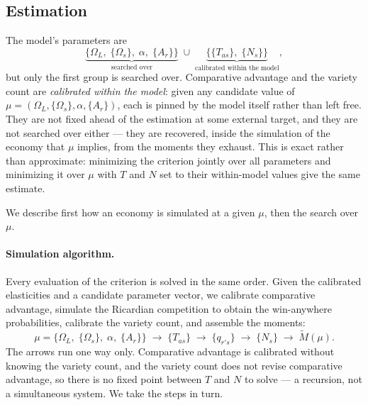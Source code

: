 \subsection{Estimation}
\label{app:model-estimation}

The model's parameters are
\begin{equation}
\underbrace{\big\{\Omega_{L},\;\{\Omega_{s}\},\;\alpha,\;\{A_{r}\}\big\}}_{\text{searched over}}
\;\cup\;
\underbrace{\big\{\{T_{as}\},\;\{N_{s}\}\big\}}_{\text{calibrated within the model}},
\label{eq:app-param-split}
\end{equation}
but only the first group is searched over. Comparative advantage and the variety count are
\emph{calibrated within the model}: given any candidate value of
$\mu=(\Omega_{L},\{\Omega_{s}\},\alpha,\{A_{r}\})$, each is pinned by the model itself rather
than left free. They are not fixed ahead of the estimation at some external target, and they are
not searched over either --- they are recovered, inside the simulation of the economy that $\mu$
implies, from the moments they exhaust. This is exact rather than approximate: minimizing the
criterion jointly over all parameters and minimizing it over $\mu$ with $T$ and $N$ set to their
within-model values give the same estimate.

We describe first how an economy is simulated at a given $\mu$, then the search over $\mu$.

\paragraph{Simulation algorithm.} Every evaluation of the criterion is solved in the same order.
Given the calibrated elasticities and a candidate parameter vector, we calibrate comparative
advantage, simulate the Ricardian competition to obtain the win-anywhere probabilities, calibrate
the variety count, and assemble the moments:
\begin{equation}
\mu=\big\{\Omega_{L},\;\{\Omega_{s}\},\;\alpha,\;\{A_{r}\}\big\}
\;\longrightarrow\;\{T_{as}\}
\;\longrightarrow\;\{q_{r's}\}
\;\longrightarrow\;\{N_{s}\}
\;\longrightarrow\;\tilde M(\mu) .
\label{eq:app-recursion}
\end{equation}
The arrows run one way only. Comparative advantage is calibrated without knowing the variety
count, and the variety count does not revise comparative advantage, so there is no fixed point
between $T$ and $N$ to solve --- a recursion, not a simultaneous system. We take the steps in
turn.

